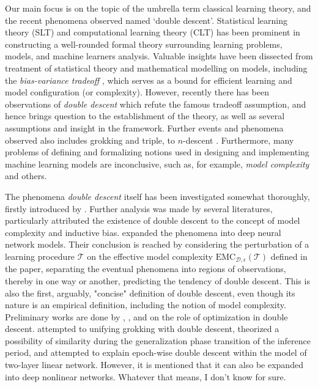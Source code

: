 Our main focus is on the topic of the umbrella term classical learning theory, and the recent phenomena observed named `double descent'. Statistical learning theory (SLT) and computational learning theory (CLT) \cite{Vapnik1999-VAPTNO,10.5555/2371238,10.5555/2621980,STL_Hajek_Maxim_2021,bousquet2020theoryuniversallearning} has been prominent in constructing a well-rounded formal theory surrounding learning problems, models, and machine learners analysis. Valuable insights have been dissected from treatment of statistical theory and mathematical modelling on models, including the \textit{bias-variance tradeoff} \cite{6797087,Domingos2000AUB}, which serves as a bound for efficient learning and model configuration (or complexity). However, recently there has been observations of \textit{double descent} \cite{belkin_reconciling_2019,schaeffer_double_2023,nakkiran_deep_2019,lafon_understanding_2024} which refute the famous tradeoff assumption, and hence brings question to the establishment of the theory, as well as several assumptions and insight in the framework. Further events and phenomena observed also includes grokking and triple, to $n$-descent \cite{davies_unifying_2023,d_ascoli_triple_2020}. Furthermore, many problems of defining and formalizing notions used in designing and implementing machine learning models are inconclusive, such as, for example, \textit{model complexity} and others. 

The phenomena \textit{double descent} itself has been investigated somewhat thoroughly, firstly introduced by \cite{belkin_reconciling_2019}. Further analysis was made by several literatures, particularly attributed the existence of double descent to the concept of model complexity and inductive bias. \cite{nakkiran_deep_2019} expanded the phenomena into deep neural network models. Their conclusion is reached by considering the perturbation of a learning procedure $\mathcal{T}$ on the effective model complexity $\mathrm{EMC}_{\mathcal{D},\epsilon}(\mathcal{T})$ defined in the paper, separating the eventual phenomena into regions of observations, thereby in one way or another, predicting the tendency of double descent. This is also the first, arguably, "concise" definition of double descent, even though its nature is an empirical definition, including the notion of model complexity. Preliminary works are done by \cite{lafon_understanding_2024}, \cite{schaeffer_double_2023}, and \cite{liu2023understandingroleoptimizationdouble} on the role of optimization in double descent. \cite{davies_unifying_2023} attempted to unifying grokking with double descent, theorized a possibility of similarity during the generalization phase transition of the inference period, and \cite{olmin2024understandingepochwisedoubledescent} attempted to explain epoch-wise double descent within the model of two-layer linear network. However, it is mentioned that it can also be expanded into deep nonlinear networks. Whatever that means, I don't know for sure. 

